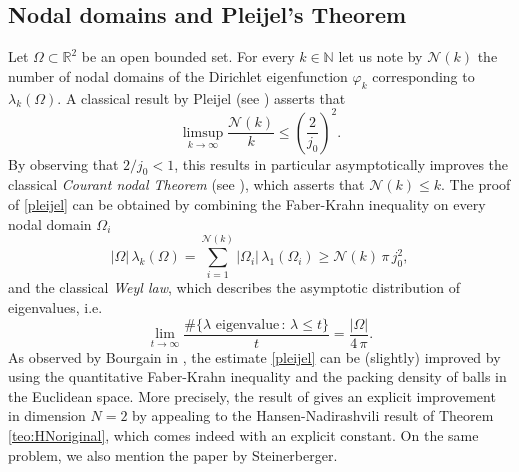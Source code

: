 \documentclass{amsart}
\theoremstyle{definition}
\numberwithin{equation}{section}
\begin{document}
\subsection{Nodal domains and Pleijel's Theorem}
Let $\Omega\subset\mathbb{R}^2$ be an open bounded set. For every $k\in\mathbb{N}$ let us note by $\mathcal{N}(k)$ the number of nodal domains of the Dirichlet eigenfunction $\varphi_k$ corresponding to $\lambda_k(\Omega)$. A classical result by Pleijel (see \cite{MR0080861}) asserts that 
\begin{equation}
\label{pleijel}
\limsup_{k\to\infty} \frac{\mathcal{N}(k)}{k}\le \left(\frac{2}{j_0}\right)^2.
\end{equation}
By observing that $2/j_0<1$, this results in particular asymptotically improves the classical {\it Courant nodal Theorem} (see \cite[Theorem 1.3.2]{MR2251558}), which asserts that $\mathcal{N}(k)\le k$.
The proof of \eqref{pleijel} can be obtained by combining the Faber-Krahn inequality on every nodal domain $\Omega_i$
\[
|\Omega|\,\lambda_k(\Omega)=\sum_{i=1}^{\mathcal{N}(k)} |\Omega_i|\,\lambda_1(\Omega_i)\ge \mathcal{N}(k)\,\pi\,j_0^2,
\] 
 and the classical {\it Weyl law}, which describes the asymptotic distribution of eigenvalues, i.e. 
\[
 \lim_{t\to\infty} \frac{\#\{\lambda \mbox{ eigenvalue} \, :\, \lambda\le t\}}{t}=\frac{|\Omega|}{4\,\pi}.
\]
As observed by Bourgain in \cite{MR3340367}, the estimate \eqref{pleijel} can be (slightly) improved by using the quantitative Faber-Krahn inequality and the packing density of balls in the Euclidean space. More precisely, the result of \cite{MR3340367} gives an explicit improvement in dimension $N=2$ by appealing to the Hansen-Nadirashvili result of Theorem \ref{teo:HNoriginal}, which comes indeed with an explicit constant. On the same problem, we also mention the paper \cite{MR3272823} by Steinerberger.
\end{document}
